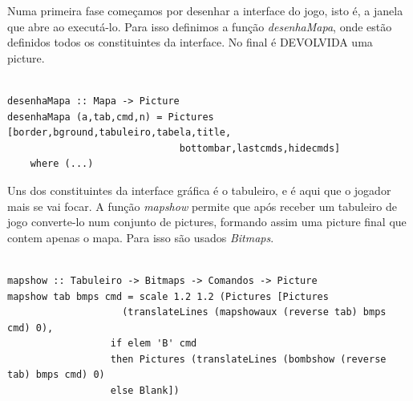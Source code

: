 \documentclass[12pt,a4paper]{report}
\begin{document}
\hfill

Numa primeira fase começamos por desenhar a interface do jogo, isto é, a janela que abre ao executá-lo.
Para isso definimos a função \emph{desenhaMapa}, onde estão definidos todos os constituintes da interface. No final é DEVOLVIDA uma picture.\\

\begin{verbatim}

desenhaMapa :: Mapa -> Picture
desenhaMapa (a,tab,cmd,n) = Pictures [border,bground,tabuleiro,tabela,title,
                              bottombar,lastcmds,hidecmds]
    where (...)

\end{verbatim}

 \hfill

 \hfill


Uns dos constituintes da interface gráfica é o tabuleiro, e é aqui que o jogador mais se vai focar. A função \emph{mapshow} permite que após receber um tabuleiro de jogo converte-lo num conjunto de pictures, formando assim uma picture final que contem apenas o mapa. Para isso são usados \emph{Bitmaps}.\\

\begin{verbatim}

mapshow :: Tabuleiro -> Bitmaps -> Comandos -> Picture
mapshow tab bmps cmd = scale 1.2 1.2 (Pictures [Pictures 
                    (translateLines (mapshowaux (reverse tab) bmps cmd) 0),
                  if elem 'B' cmd 
                  then Pictures (translateLines (bombshow (reverse tab) bmps cmd) 0) 
                  else Blank])

\end{verbatim}
\end{document}
